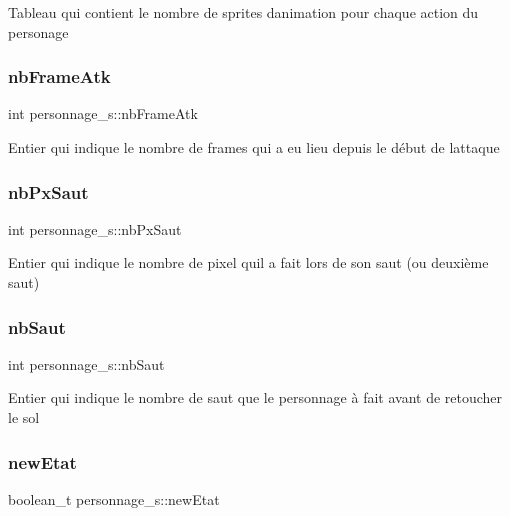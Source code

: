 Tableau qui contient le nombre de sprites d\textquotesingle{}animation pour chaque action du personage \mbox{\label{structpersonnage__s_a9dc9cf38290d069f2bfbdfe1b19184ac}} 
\subsubsection{\texorpdfstring{nb\+Frame\+Atk}{nbFrameAtk}}
{\footnotesize\ttfamily int personnage\+\_\+s\+::nb\+Frame\+Atk}

Entier qui indique le nombre de frames qui a eu lieu depuis le début de l\textquotesingle{}attaque \mbox{\label{structpersonnage__s_a47e8c34ccb98b49ca57baa55d4326ee3}} 
\subsubsection{\texorpdfstring{nb\+Px\+Saut}{nbPxSaut}}
{\footnotesize\ttfamily int personnage\+\_\+s\+::nb\+Px\+Saut}

Entier qui indique le nombre de pixel qu\textquotesingle{}il a fait lors de son saut (ou deuxième saut) \mbox{\label{structpersonnage__s_a1b5dac574e8ad57eaa9989699fbfb139}} 
\subsubsection{\texorpdfstring{nb\+Saut}{nbSaut}}
{\footnotesize\ttfamily int personnage\+\_\+s\+::nb\+Saut}

Entier qui indique le nombre de saut que le personnage à fait avant de retoucher le sol \mbox{\label{structpersonnage__s_ad9c2e07633c2a40855b169b4b677009f}} 
\subsubsection{\texorpdfstring{new\+Etat}{newEtat}}
{\footnotesize\ttfamily boolean\+\_\+t personnage\+\_\+s\+::new\+Etat}

